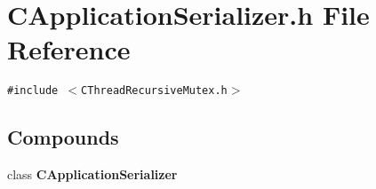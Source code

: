 \section{CApplication\-Serializer.h File Reference}
\label{CApplicationSerializer_8h}
{\tt \#include $<$CThread\-Recursive\-Mutex.h$>$}\par
\subsection*{Compounds}
\begin{CompactItemize}
\item 
class {\bf CApplication\-Serializer}
\end{CompactItemize}
